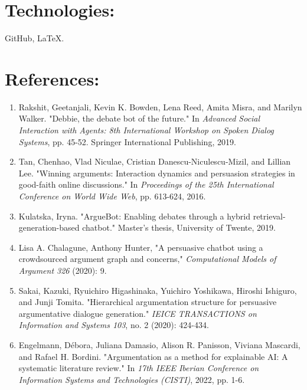 \documentclass[12pt]{article}
\begin{document}
\section*{Technologies:}
\begin{small}
    GitHub, LaTeX.
\end{small}

\newpage

\section*{References:}
\begin{enumerate}
    \item Rakshit, Geetanjali, Kevin K. Bowden, Lena Reed, Amita Misra, and Marilyn Walker. "Debbie, the debate bot of the future." In \textit{Advanced Social Interaction with Agents: 8th International Workshop on Spoken Dialog Systems}, pp. 45-52. Springer International Publishing, 2019.
    \item Tan, Chenhao, Vlad Niculae, Cristian Danescu-Niculescu-Mizil, and Lillian Lee. "Winning arguments: Interaction dynamics and persuasion strategies in good-faith online discussions." In \textit{Proceedings of the 25th International Conference on World Wide Web}, pp. 613-624, 2016.
    \item Kulatska, Iryna. "ArgueBot: Enabling debates through a hybrid retrieval-generation-based chatbot." Master's thesis, University of Twente, 2019.
    \item Lisa A. Chalagune, Anthony Hunter, "A persuasive chatbot using a crowdsourced argument graph and concerns," \textit{Computational Models of Argument 326} (2020): 9.
    \item Sakai, Kazuki, Ryuichiro Higashinaka, Yuichiro Yoshikawa, Hiroshi Ishiguro, and Junji Tomita. "Hierarchical argumentation structure for persuasive argumentative dialogue generation." \textit{IEICE TRANSACTIONS on Information and Systems 103}, no. 2 (2020): 424-434.
    \item Engelmann, Débora, Juliana Damasio, Alison R. Panisson, Viviana Mascardi, and Rafael H. Bordini. "Argumentation as a method for explainable AI: A systematic literature review." In \textit{17th IEEE Iberian Conference on Information Systems and Technologies (CISTI)}, 2022, pp. 1-6.
\end{enumerate}
\end{document}
